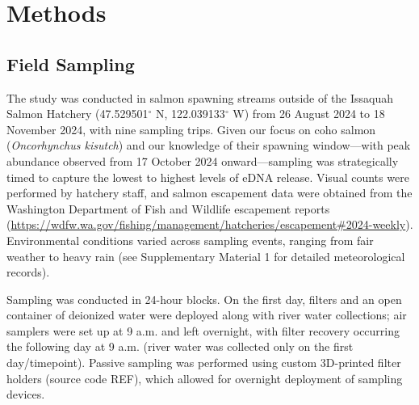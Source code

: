 \documentclass{article}
\begin{document}
\section{Methods}

\subsection{Field Sampling}

The study was conducted in salmon spawning streams outside of the Issaquah Salmon Hatchery (47.529501$^\circ$ N, 122.039133$^\circ$ W) from 26 August 2024 to 18 November 2024, with nine sampling trips. Given our focus on coho salmon (\textit{Oncorhynchus kisutch}) and our knowledge of their spawning window—with peak abundance observed from 17 October 2024 onward—sampling was strategically timed to capture the lowest to highest levels of eDNA release. Visual counts were performed by hatchery staff, and salmon escapement data were obtained from the Washington Department of Fish and Wildlife escapement reports (\href{https://wdfw.wa.gov/fishing/management/hatcheries/escapement#2024-weekly}{https://wdfw.wa.gov/fishing/management/hatcheries/escapement\#2024-weekly}). Environmental conditions varied across sampling events, ranging from fair weather to heavy rain (see Supplementary Material 1 for detailed meteorological records).

Sampling was conducted in 24-hour blocks. On the first day, filters and an open container of deionized water were deployed along with river water collections; air samplers were set up at 9 a.m. and left overnight, with filter recovery occurring the following day at 9 a.m. (river water was collected only on the first day/timepoint). Passive sampling was performed using custom 3D-printed filter holders (source code REF), which allowed for overnight deployment of sampling devices.
\end{document}
